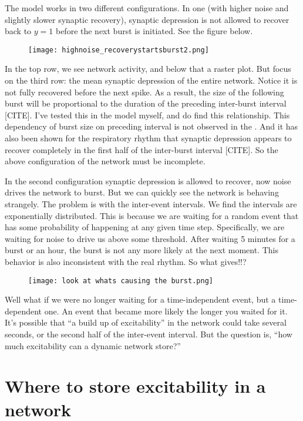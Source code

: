 \documentclass{article}
\begin{document}
The model works in two different configurations. In one (with higher noise and slightly slower synaptic recovery), synaptic depression is not allowed to recover back to $y=1$ before the next burst is initiated. See the figure below. 
\begin{figure}[H]
\centering
\texttt{[image: highnoise\_recoverystartsburst2.png]}
\end{figure}
In the top row, we see network activity, and below that a raster plot. But focus on the third row: the mean synaptic depression of the entire network. Notice it is not fully recovered before the next spike. As a result, the size of the following burst will be proportional to the duration of the preceding inter-burst interval [CITE]. I've tested this in the model myself, and do find this relationship. This dependency of burst size on preceding interval is not observed in the \pre. And it has also been shown for the respiratory rhythm that synaptic depression appears to recover completely in the first half of the inter-burst interval [CITE]. So the above configuration of the network must be incomplete.
\dskip



In the second configuration synaptic depression is allowed to recover, now noise drives the network to burst. But we can quickly see the network is behaving strangely. The problem is with the inter-event intervals. We find the intervals are exponentially distributed. This is because we are waiting for a random event that has some probability of happening at any given time step. Specifically, we are waiting for noise to drive us above some threshold. After waiting 5 minutes for a burst or an hour, the burst is not any more likely at the next moment. This behavior is also inconsistent with the real \pre rhythm. So what gives!!?
\begin{figure}[H]
\centering
\texttt{[image: look at whats causing the burst.png]}
\end{figure}
\dskip

Well what if we were no longer waiting for a time-independent event, but a time-dependent one. An event that became more likely the longer you waited for it. It's possible that ``a build up of excitability'' in the network could take several seconds, or the second half of the inter-event interval. But the question is, ``how much excitability can a dynamic network store?''


\section{Where to store excitability in a network}
\end{document}
